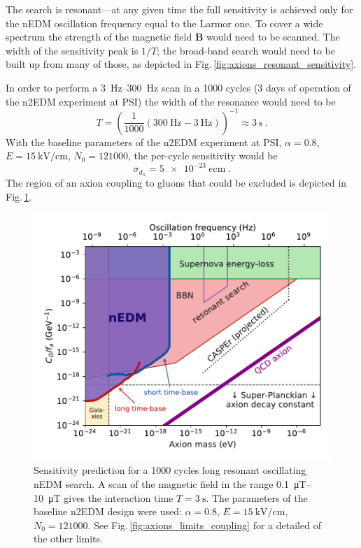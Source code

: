 The search is resonant---at any given time the full sensitivity is achieved only for the nEDM oscillation frequency equal to the Larmor one. To cover a wide spectrum the strength of the magnetic field $\mathbf{B}$ would need to be scanned. The width of the sensitivity peak is $1/T$; the broad-band search would need to be built up from many of those, as depicted in Fig.\,\ref{fig:axions_resonant_sensitivity}. 

In order to perform a \SIrange[range-phrase=--]{3}{300}{\hertz} scan in a 1000 cycles (3 days of operation of the n2EDM experiment at PSI) the width of the resonance would need to be
\begin{equation}
  T = {\left( \frac{1}{1000} \left( \SI{300}{\hertz} - \SI{3}{\hertz} \right)  \right)}^{-1} \approx \SI{3}{\second} \ .
\end{equation}
With the baseline parameters of the n2EDM experiment at PSI, $\alpha = 0.8$, $E = \SI{15}{\kilo\volt\per\centi\metre}$, $N_0 = \num{121000}$, the per-cycle sensitivity would be 
\begin{equation}
  \sigma_{d_n} = \SI{5e-23}{\elementarycharge\centi\metre} \ .
\end{equation}
The region of an axion coupling to gluons that could be excluded is depicted in Fig.\,\ref{fig:axions_prediction}.

\begin{figure}
  \centering
  \includegraphics[width=\linewidth]{gfx/axions/resonant_search_exclusion_1000cycles_n2EDM.pdf}
  \caption{Sensitivity prediction for a 1000 cycles long resonant oscillating nEDM search. A scan of the magnetic field in the range \SIrange[range-phrase=--]{0.1}{10}{\micro\tesla} gives the interaction time $T = \SI{3}{\second}$. The parameters of the baseline n2EDM design were used: $\alpha = 0.8$, $E = \SI{15}{\kilo\volt\per\centi\metre}$, $N_0 = \num{121000}$. See Fig.\,\ref{fig:axions_limits_coupling} for a detailed of the other limits.}\label{fig:axions_prediction}
\end{figure}

